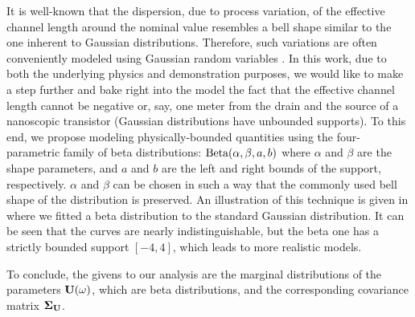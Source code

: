 
It is well-known that the dispersion, due to process variation, of the effective channel length around the nominal value resembles a bell shape similar to the one inherent to Gaussian distributions.
Therefore, such variations are often conveniently modeled using Gaussian random variables \cite{srivastava2010, juan2011, juan2012, chandra2010, shen2009, bhardwaj2006, ghanta2006}.
In this work, due to both the underlying physics and demonstration purposes, we would like to make a step further and bake right into the model the fact that the effective channel length cannot be negative or, say, one meter from the drain and the source of a nanoscopic transistor (Gaussian distributions have unbounded supports).
To this end, we propose modeling physically-bounded quantities using the four-parametric family of beta distributions: $\text{Beta}(\alpha, \beta, a, b)$ where $\alpha$ and $\beta$ are the shape parameters, and $a$ and $b$ are the left and right bounds of the support, respectively.
$\alpha$ and $\beta$ can be chosen in such a way that the commonly used bell shape of the distribution is preserved.
An illustration of this technique is given in  where we fitted a beta distribution to the standard Gaussian distribution.
It can be seen that the curves are nearly indistinguishable, but the beta one has a strictly bounded support $[-4, 4]$, which leads to more realistic models.

To conclude, the givens to our analysis are the marginal distributions of the parameters $\mathbf{U}(\omega)$, which are beta distributions, and the corresponding covariance matrix $\mCorr_\vU$.
